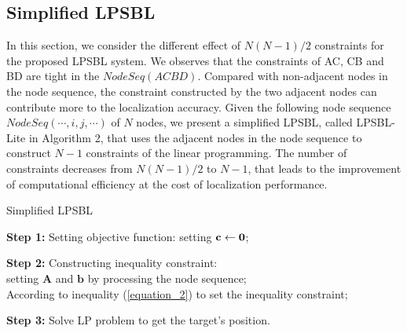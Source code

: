  \vspace{-3mm}  
 \subsection{Simplified LPSBL}
 
  
  In this section, we consider the different effect of  $N(N - 1)/2$ constraints for the proposed LPSBL system.     
  We observes that the constraints of AC, CB and BD are tight in the $NodeSeq (A C B D)$.  
  Compared with non-adjacent nodes in the node sequence, the constraint constructed by the two adjacent nodes can contribute more to the localization accuracy. 
  Given the following node sequence $NodeSeq( \cdots ,i,j, \cdots )$ of $N$ nodes, 
  we present a simplified LPSBL, called LPSBL-Lite in Algorithm 2, that uses the adjacent nodes in the node sequence to construct $N-1$ constraints of the linear programming.
  The number of constraints decreases from $N(N - 1)/2$  to $N-1$, that leads to the improvement of computational efficiency at the cost of localization performance.
\begin{algorithm}
\caption{Simplified LPSBL}

\textbf{Step 1:} Setting objective function: setting $\bf{c} \leftarrow \bf{0}$;

\textbf{Step 2:} Constructing inequality constraint: \\ 
\hspace{0.41in} setting $\bm{A}$ and $\bm{b}$ by processing the node sequence;\\
{
{
According to inequality (\ref{equation_2}) to set the inequality constraint;
}
}

\textbf{Step 3:} Solve LP problem to get the target's position.

\end{algorithm}

